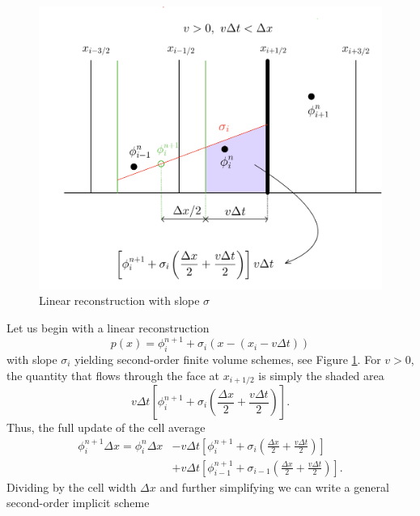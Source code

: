 \documentclass[../thesis.tex]{subfiles}
\begin{document}
\begin{figure}[H]
	\centering
	\includegraphics[width=\textwidth]{2nd-order-crop.pdf}
	\caption{Linear reconstruction with slope \(\sigma\)}
	\label{fig:linear-rec-1d}
\end{figure}
Let us begin with a linear reconstruction
\begin{equation}\label{eqn:linear-rec-poly}
    p(x) = \phi_{i}^{n+1} + \sigma_{i}\left( x - (x_{i}-v\Delta t) \right)
\end{equation}
with slope \(\sigma_{i}\) yielding second-order finite volume schemes, see Figure \ref{fig:linear-rec-1d}.
For \(v>0\), the quantity that flows through the face at \(x_{i+1/2}\) is simply the shaded area
\[ v\Delta t\left[
    \phi_{i}^{n+1} + \sigma_{i}\left( \frac{\Delta x}{2} + \frac{v\Delta t}{2} \right)
\right]. \]
Thus, the full update of the cell average
\begin{equation}
    \begin{split}
        \phi_{i}^{n+1}\Delta x
        =
        \phi_{i}^{n}\Delta x
        &-v\Delta t\left[
            \phi_{i}^{n+1} + \sigma_{i}\left( \frac{\Delta x}{2} + \frac{v\Delta t}{2} \right)
        \right]
        \\
        &+v\Delta t\left[
            \phi_{i-1}^{n+1} + \sigma_{i-1}\left( \frac{\Delta x}{2} + \frac{v\Delta t}{2} \right)
        \right].
    \end{split}
\end{equation}
Dividing by the cell width \(\Delta x\) and further simplifying we can write a general second-order implicit scheme
\end{document}
